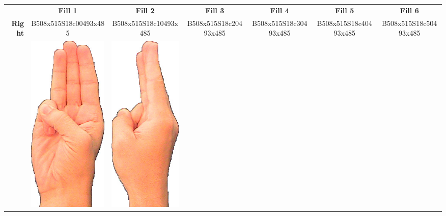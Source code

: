 \documentclass{article}
\begin{document}
\begin{center}
\begin{tabular}{r*{6}{c}}
&\textbf{Fill 1}&\textbf{Fill 2}&\textbf{Fill 3}&\textbf{Fill 4}&\textbf{Fill 5}&\textbf{Fill 6}\\
\multirow{2}{*}{\textbf{Right}}&
B508x515S18c00493x485&
B508x515S18c10493x485&
B508x515S18c20493x485&
B508x515S18c30493x485&
B508x515S18c40493x485&
B508x515S18c50493x485\\
&
\includegraphics[scale=0.1]{images/06-04-1.jpg}&
\includegraphics[scale=0.1]{images/06-04-2.jpg}&

\end{tabular}
\end{center}
\end{document}
